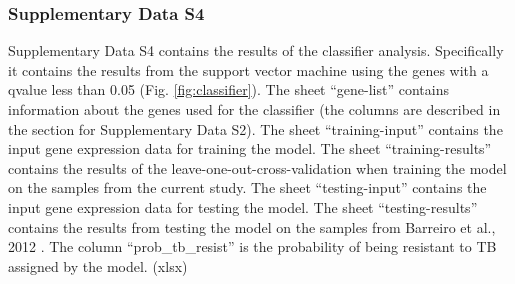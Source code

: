 \documentclass[fleqn,10pt]{wlscirep}
\begin{document}
\subsubsection*{Supplementary Data S4}

Supplementary Data S4 contains the results of the classifier analysis.
Specifically it contains the results from the support vector machine
using the genes with a qvalue less than 0.05 (Fig.
\ref{fig:classifier}). The sheet “gene-list” contains information
about the genes used for the classifier (the columns are described in
the section for Supplementary Data S2). The sheet “training-input”
contains the input gene expression data for training the model. The
sheet “training-results” contains the results of the
leave-one-out-cross-validation when training the model on the samples
from the current study.  The sheet “testing-input” contains the input
gene expression data for testing the model. The sheet
“testing-results” contains the results from testing the model on the
samples from Barreiro et al., 2012 \cite{Barreiro2012}. The column
“prob\_tb\_resist” is the probability of being resistant to TB
assigned by the model. (xlsx)
\end{document}
